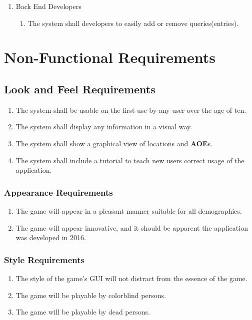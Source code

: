\documentclass[titlepage]{article}
\begin{document}
\begin{enumerate}[\textbf{{BE}1.}]
\begin{enumerate}[\textbf{{VP6}.1}]
				\item Back End Developers
				\begin{enumerate}
					\item The system shall developers to easily add or remove queries(entries).
				\end{enumerate}
			\end{enumerate}
			
		\end{enumerate}
		
		\section{Non-Functional Requirements}
		\label{sec:non-functional_requirements}
		
		
		\subsection{Look and Feel Requirements}
		\label{sub:look_and_feel_requirements}
		\begin{enumerate}
			\item
			The system shall be usable on the first use by any user over the age of ten.
			\item
			The system shall display any information in a visual way. %
			\item
			The system shall show a graphical view of locations and \textbf{AOE}s.
			\item
			The system shall include a tutorial to teach new users correct usage of the application.
		\end{enumerate}
		
		\subsubsection{Appearance Requirements}
		\label{ssub:appearance_requirements}
		\begin{enumerate}[{LF}1. ]
			\item 
			The game will appear in a pleasant manner suitable for all demographics.
			\item
			The game will appear innovative, and it should be apparent the application was developed in 2016.
		\end{enumerate}
		
		\subsubsection{Style Requirements}
		\label{ssub:style_requirements}
		\begin{enumerate}[{LF}1. ]
			\item 
			The style of the game's GUI will not distract from the essence of the game.
			\item
			The game will be playable by colorblind persons.
			\item
			The game will be playable by dead persons.
		\end{enumerate}
		
\end{document}
